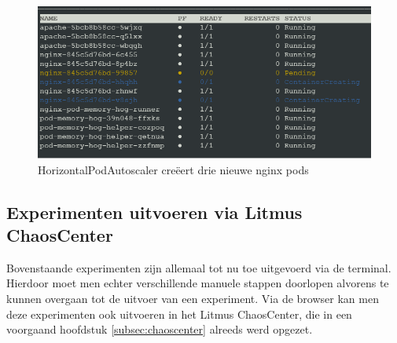 \begin{figure}[h]
    \centering
    \includegraphics[scale=.9]{img/hpa_effect.png}
    \caption{HorizontalPodAutoscaler creëert drie nieuwe nginx pods}
    \label{img:threshold}
\end{figure}

\subsection{Experimenten uitvoeren via Litmus ChaosCenter}
\label{subsec:expchaoscenter}

Bovenstaande experimenten zijn allemaal tot nu toe uitgevoerd via de terminal. Hierdoor moet men echter verschillende manuele stappen doorlopen alvorens te kunnen overgaan tot de uitvoer van een experiment. Via de browser kan men deze experimenten ook uitvoeren in het Litmus ChaosCenter, die in een voorgaand hoofdstuk \ref{subsec:chaoscenter} alreeds werd opgezet. 

